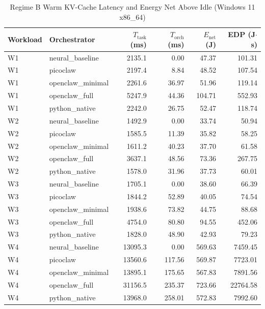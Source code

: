 \begin{table}[t]
\centering\small
\caption{Regime B Warm KV-Cache Latency and Energy Net Above Idle (Windows 11 x86_64)}
\label{tab:Windows_warm_cache}
\begin{tabular}{llrrrr}
\toprule
Workload & Orchestrator & $T_{\text{task}}$ (ms) & $T_{\text{orch}}$ (ms) & $E_{\text{net}}$ (J) & EDP (J$\cdot$s) \\
\midrule
W1 & neural\_baseline & 2135.1 & 0.00 & 47.37 & 101.31 \\
W1 & picoclaw & 2197.4 & 8.84 & 48.52 & 107.54 \\
W1 & openclaw\_minimal & 2261.6 & 36.97 & 51.96 & 119.14 \\
W1 & openclaw\_full & 5247.9 & 44.36 & 104.71 & 552.93 \\
W1 & python\_native & 2242.0 & 26.75 & 52.47 & 118.74 \\
W2 & neural\_baseline & 1492.9 & 0.00 & 33.74 & 50.94 \\
W2 & picoclaw & 1585.5 & 11.39 & 35.82 & 58.25 \\
W2 & openclaw\_minimal & 1611.2 & 40.23 & 37.70 & 61.58 \\
W2 & openclaw\_full & 3637.1 & 48.56 & 73.36 & 267.75 \\
W2 & python\_native & 1578.0 & 31.96 & 37.73 & 60.01 \\
W3 & neural\_baseline & 1705.1 & 0.00 & 38.60 & 66.39 \\
W3 & picoclaw & 1844.2 & 52.89 & 40.05 & 74.54 \\
W3 & openclaw\_minimal & 1938.6 & 73.82 & 44.75 & 88.68 \\
W3 & openclaw\_full & 4754.0 & 80.80 & 94.55 & 452.06 \\
W3 & python\_native & 1828.0 & 48.90 & 42.93 & 79.23 \\
W4 & neural\_baseline & 13095.3 & 0.00 & 569.63 & 7459.45 \\
W4 & picoclaw & 13560.6 & 117.56 & 569.87 & 7723.01 \\
W4 & openclaw\_minimal & 13895.1 & 175.65 & 567.83 & 7891.56 \\
W4 & openclaw\_full & 31156.5 & 235.37 & 723.66 & 22764.58 \\
W4 & python\_native & 13968.0 & 258.01 & 572.83 & 7992.60 \\
\bottomrule
\end{tabular}
\end{table}
